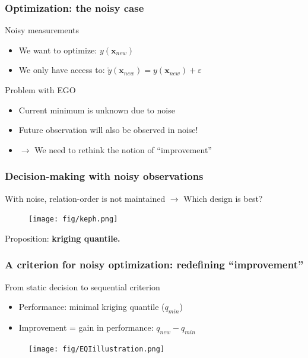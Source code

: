 \documentclass[10pt]{beamer}
\begin{document}
\frame
{
\frametitle{Optimization: the noisy case}
\begin{block}{Noisy measurements}
\begin{itemize}
	\item We want to optimize: $y(\mathbf{x}_{new})$
	\item We only have access to: $\tilde y(\mathbf{x}_{new}) = y(\mathbf{x}_{new}) + \varepsilon$
\end{itemize}
\end{block}

\begin{block}{Problem with EGO}
\begin{itemize}
	\item Current minimum is unknown due to noise
	\item Future observation will also be observed in noise!
	\item $\rightarrow$ We need to rethink the notion of ``improvement''
\end{itemize}
\end{block}
}

\frame
{
\frametitle{Decision-making with noisy observations}
With noise, relation-order is not maintained $\rightarrow$ Which design is best?
\vspace{-3mm}
\begin{figure}[h!]  \centering	\texttt{[image: fig/keph.png]} \end{figure}
\vspace{-4mm}
Proposition: \bf{kriging quantile}.
}

\frame
{
\frametitle{A criterion for noisy optimization: redefining ``improvement''}
\begin{block}{From static decision to sequential criterion}
\begin{itemize}
\vspace{-1mm}
	\item Performance: minimal kriging quantile ($q_{min}$)
	\item Improvement = gain in performance: $q_{new} - q_{min}$
\end{itemize}
\end{block}
\begin{figure}[h!]  \centering	\texttt{[image: fig/EQIillustration.png]} \end{figure}

}
\end{document}

